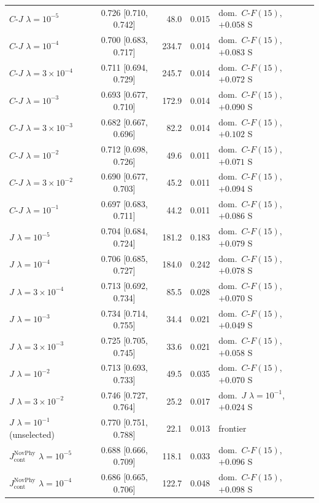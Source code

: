 {\begin{revblock}
\begin{longtable}{@{}lcrrl@{}}
$C\text{-}J$ $\lambda{=}10^{-5}$ & 0.726 [0.710, 0.742] & 48.0 & 0.015 & dom.\ $C\text{-}F(15)$, $+0.058$ S \\
$C\text{-}J$ $\lambda{=}10^{-4}$ & 0.700 [0.683, 0.717] & 234.7 & 0.014 & dom.\ $C\text{-}F(15)$, $+0.083$ S \\
$C\text{-}J$ $\lambda{=}3{\times}10^{-4}$ & 0.711 [0.694, 0.729] & 245.7 & 0.014 & dom.\ $C\text{-}F(15)$, $+0.072$ S \\
$C\text{-}J$ $\lambda{=}10^{-3}$ & 0.693 [0.677, 0.710] & 172.9 & 0.014 & dom.\ $C\text{-}F(15)$, $+0.090$ S \\
$C\text{-}J$ $\lambda{=}3{\times}10^{-3}$ & 0.682 [0.667, 0.696] & 82.2 & 0.014 & dom.\ $C\text{-}F(15)$, $+0.102$ S \\
$C\text{-}J$ $\lambda{=}10^{-2}$ & 0.712 [0.698, 0.726] & 49.6 & 0.011 & dom.\ $C\text{-}F(15)$, $+0.071$ S \\
$C\text{-}J$ $\lambda{=}3{\times}10^{-2}$ & 0.690 [0.677, 0.703] & 45.2 & 0.011 & dom.\ $C\text{-}F(15)$, $+0.094$ S \\
$C\text{-}J$ $\lambda{=}10^{-1}$ & 0.697 [0.683, 0.711] & 44.2 & 0.011 & dom.\ $C\text{-}F(15)$, $+0.086$ S \\
$J$ $\lambda{=}10^{-5}$ & 0.704 [0.684, 0.724] & 181.2 & 0.183 & dom.\ $C\text{-}F(15)$, $+0.079$ S \\
$J$ $\lambda{=}10^{-4}$ & 0.706 [0.685, 0.727] & 184.0 & 0.242 & dom.\ $C\text{-}F(15)$, $+0.078$ S \\
$J$ $\lambda{=}3{\times}10^{-4}$ & 0.713 [0.692, 0.734] & 85.5 & 0.028 & dom.\ $C\text{-}F(15)$, $+0.070$ S \\
$J$ $\lambda{=}10^{-3}$ & 0.734 [0.714, 0.755] & 34.4 & 0.021 & dom.\ $C\text{-}F(15)$, $+0.049$ S \\
$J$ $\lambda{=}3{\times}10^{-3}$ & 0.725 [0.705, 0.745] & 33.6 & 0.021 & dom.\ $C\text{-}F(15)$, $+0.058$ S \\
$J$ $\lambda{=}10^{-2}$ & 0.713 [0.693, 0.733] & 49.5 & 0.035 & dom.\ $C\text{-}F(15)$, $+0.070$ S \\
$J$ $\lambda{=}3{\times}10^{-2}$ & 0.746 [0.727, 0.764] & 25.2 & 0.017 & dom.\ $J$ $\lambda{=}10^{-1}$, $+0.024$ S \\
$J$ $\lambda{=}10^{-1}$ (unselected) & 0.770 [0.751, 0.788] & 22.1 & 0.013 & frontier \\
$J_{\mathrm{cont}}^{\mathrm{NovPhy}}$ $\lambda{=}10^{-5}$ & 0.688 [0.666, 0.709] & 118.1 & 0.033 & dom.\ $C\text{-}F(15)$, $+0.096$ S \\
$J_{\mathrm{cont}}^{\mathrm{NovPhy}}$ $\lambda{=}10^{-4}$ & 0.686 [0.665, 0.706] & 122.7 & 0.048 & dom.\ $C\text{-}F(15)$, $+0.098$ S \\

\end{longtable}
\end{revblock}}
